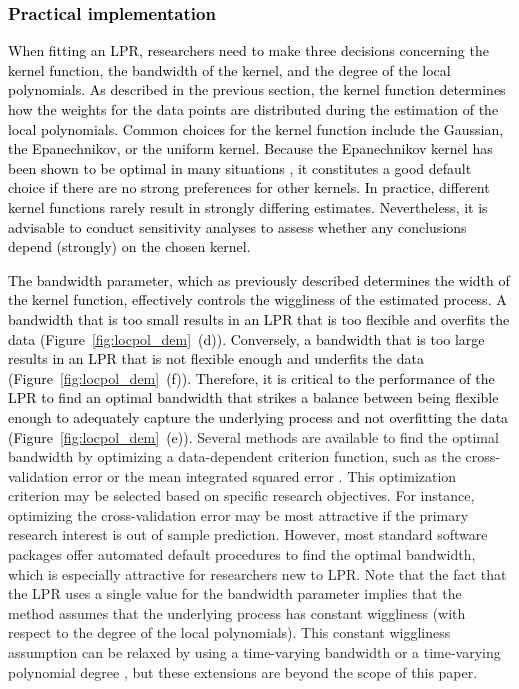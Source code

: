 \documentclass[man, floatsintext]{apa7}
\begin{document}
\subsubsection{\textcolor{black}{Practical implementation}}

\textcolor{black}{
  When fitting an LPR, researchers need to make three decisions concerning the
  kernel function, the bandwidth of the kernel, and the degree of the local
  polynomials. As described in the previous section, the kernel function
  determines how the weights for the data points are distributed during
  the estimation of the local polynomials. Common choices for the kernel
  function include the
  Gaussian, the Epanechnikov, or the uniform kernel. Because the
  Epanechnikov kernel has been shown to be optimal in many situations
  \parencite{fan_local_1997}, it constitutes a good default choice if there are
  no strong preferences for other kernels. In practice, different kernel
  functions rarely result in strongly differing estimates. Nevertheless, it is
  advisable to conduct sensitivity analyses to assess whether any conclusions
  depend (strongly) on the chosen kernel.
}

\textcolor{black}{
  The bandwidth parameter, which as previously described determines the width
  of the kernel function,
  effectively controls the wiggliness of the
  estimated process. A bandwidth that is too small results in an LPR that is
  too flexible and overfits the data (Figure~\ref{fig:locpol_dem}~(d)).
  Conversely, a bandwidth that is too large results in an LPR that is not
  flexible enough and underfits the data (Figure~\ref{fig:locpol_dem}~(f)).
  Therefore, it is critical to the performance of the LPR to find an optimal
  bandwidth that strikes a balance between being flexible enough to adequately
  capture the underlying process and not overfitting the data
  (Figure~\ref{fig:locpol_dem}~(e)).} Several methods are available to find
the
optimal bandwidth by optimizing a data-dependent criterion function, such as
the cross-validation error or the mean integrated squared error
\parencite{kohler_review_2014, debruyne_model_2008}. This optimization
criterion may be selected based on specific research objectives. For instance,
optimizing the cross-validation error may be most attractive if the primary
research interest is out of sample prediction. However, most standard software
packages offer automated default procedures to find the optimal bandwidth,
which is especially attractive for researchers new to LPR\@. Note that the fact
that the LPR uses a single value for the bandwidth parameter implies that the
method assumes that the underlying process has constant wiggliness (with
respect to the degree of the local polynomials). This
constant wiggliness assumption can be relaxed by using a time-varying bandwidth
\parencite{fan_data-driven_1995} or a time-varying polynomial degree
\parencite{fan_adaptive_1995}, but these extensions are beyond the scope of
this paper.
\end{document}
